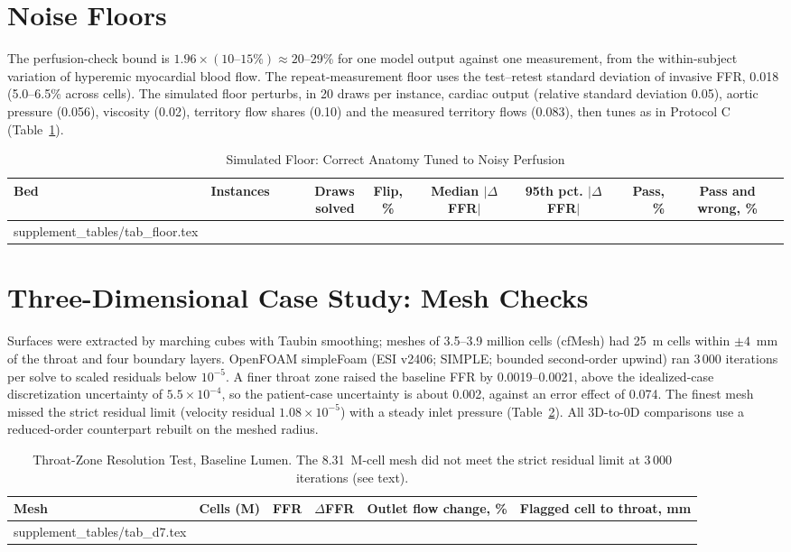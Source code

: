 \documentclass[journal,twoside,web,onecolumn]{ieeecolor}
\begin{document}
\FloatBarrier
{}
\section{Noise Floors}\label{sec:floor}
The perfusion-check bound is $1.96 \times (10\text{--}15\%) \approx 20$--29\% for one model output against one
measurement, from the within-subject variation of hyperemic myocardial blood flow. The repeat-measurement floor uses
the test--retest standard deviation of invasive FFR, 0.018 (5.0--6.5\% across cells). The simulated floor perturbs,
in 20 draws per instance, cardiac output (relative standard deviation 0.05), aortic pressure (0.056), viscosity (0.02),
territory flow shares (0.10) and the measured territory flows (0.083), then tunes as in Protocol C
(Table~\ref{tab:floor}).
\begin{table}[!ht]
\caption{Simulated Floor: Correct Anatomy Tuned to Noisy Perfusion}\label{tab:floor}
\centering\footnotesize
\begin{tabular}{@{}lrrcccrc@{}}
\toprule
Bed & Instances & Draws solved & Flip, \% & Median $|\Delta$FFR$|$ & 95th pct. $|\Delta$FFR$|$ & Pass, \% &
Pass and wrong, \%\\
\midrule
{} supplement_tables/tab_floor.tex 
\bottomrule
\end{tabular}
\end{table}

\FloatBarrier
{}
\section{Three-Dimensional Case Study: Mesh Checks}\label{sec:cfd}
Surfaces were extracted by marching cubes with Taubin smoothing; meshes of 3.5--3.9 million cells (cfMesh) had
25~\textmu m cells within $\pm 4$~mm of the throat and four boundary layers. OpenFOAM simpleFoam (ESI v2406; SIMPLE;
bounded second-order upwind) ran 3\,000 iterations per solve to scaled residuals below $10^{-5}$. A finer throat zone
raised the baseline FFR by 0.0019--0.0021, above the idealized-case discretization uncertainty of $5.5\times10^{-4}$,
so the patient-case uncertainty is about 0.002, against an error effect of 0.074. The finest mesh missed the strict residual limit (velocity residual $1.08\times10^{-5}$) with a steady inlet pressure (Table~\ref{tab:d7}). All 3D-to-0D
comparisons use a reduced-order counterpart rebuilt on the meshed radius.
\begin{table}[!ht]
\caption{Throat-Zone Resolution Test, Baseline Lumen. The 8.31~M-cell mesh did not meet the strict residual limit at
3\,000 iterations (see text).}\label{tab:d7}
\centering\footnotesize
\begin{tabular}{@{}lrrrrr@{}}
\toprule
Mesh & Cells (M) & FFR & $\Delta$FFR & Outlet flow change, \% & Flagged cell to throat, mm\\
\midrule
{} supplement_tables/tab_d7.tex 
\bottomrule
\end{tabular}
\end{table}
\end{document}
